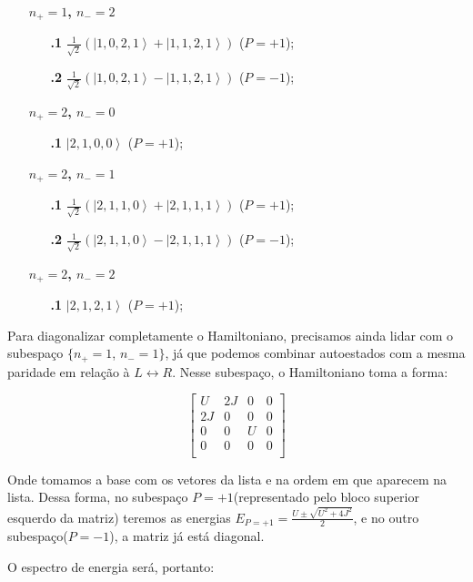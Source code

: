 \begin{itemize}
\item[\textbf{$n_{+} = 1$, $n_{-} = 2$}]
\begin{itemize}
\item[\textbf{.1}] $\frac{1}{\sqrt{2}}\left( \left| 1,0,2,1 \right> + \left| 1,1,2,1 \right> \right)$ ($P=+1$);
\item[\textbf{.2}] $\frac{1}{\sqrt{2}}\left( \left| 1,0,2,1 \right> - \left| 1,1,2,1 \right> \right)$ ($P=-1$);
\end{itemize}

\item[\textbf{$n_{+} = 2$, $n_{-} = 0$}]
\begin{itemize}
\item[\textbf{.1}] $\left| 2,1,0,0 \right>$ ($P=+1$);
\end{itemize}

\item[\textbf{$n_{+} = 2$, $n_{-} = 1$}]
\begin{itemize}
\item[\textbf{.1}] $\frac{1}{\sqrt{2}}\left( \left| 2,1,1,0 \right> + \left| 2,1,1,1 \right> \right)$ ($P=+1$);
\item[\textbf{.2}] $\frac{1}{\sqrt{2}}\left( \left| 2,1,1,0 \right> - \left| 2,1,1,1 \right> \right)$ ($P=-1$);
\end{itemize}

\item[\textbf{$n_{+} = 2$, $n_{-} = 2$}]
\begin{itemize}
\item[\textbf{.1}] $\left| 2,1,2,1 \right>$ ($P=+1$);
\end{itemize}
\end{itemize}

Para diagonalizar completamente o Hamiltoniano, precisamos ainda lidar com o subespaço $\{ n_{+} = 1$, $n_{-} = 1 \}$, já que podemos combinar autoestados com a mesma paridade em relação à $L \leftrightarrow R$. Nesse subespaço, o Hamiltoniano toma a forma:

\begin{equation}
\begin{bmatrix}
U & 2J & 0 & 0 \\
2J & 0 & 0 & 0 \\
0 & 0 & U & 0 \\
0 & 0 & 0 & 0 \\
\end{bmatrix}
\end{equation}

Onde tomamos a base com os vetores da lista e na ordem em que aparecem na lista. Dessa forma, no subespaço $P=+1$(representado pelo bloco superior esquerdo da matriz) teremos as energias $E_{P=+1}=\frac{U\pm \sqrt{U^2+4J^2}}{2}$, e no outro subespaço($P=-1$), a matriz já está diagonal.
\par
O espectro de energia será, portanto:

